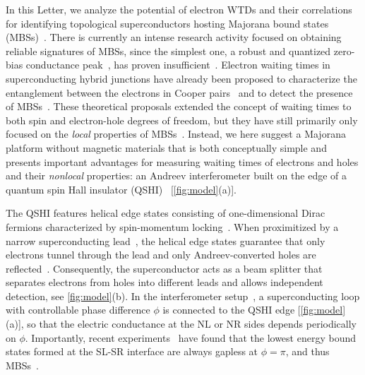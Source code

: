 \documentclass[aps,prl,amsmath,twocolumn,floatfix,superscriptaddress,longbibliography,footinbib]{revtex4-1}
\begin{document}
In this Letter, we analyze the potential of electron WTDs and their correlations for identifying topological superconductors hosting Majorana bound states (MBSs)~\cite{Kane2005,Fu2008,Fu2009,Qi2011}. 
There is currently an intense research activity focused on obtaining reliable signatures of MBSs, since the simplest one, a robust and quantized zero-bias conductance peak~\cite{Mourik2012,Higginbotham2015,Deng2016}, has proven insufficient~\cite{Frolov2019,Frolov2021}. Electron waiting times in superconducting hybrid junctions have already been proposed to characterize the entanglement between the electrons in Cooper pairs~\cite{Rajabi2013,Albert2016,Walldorf2018} and to detect the presence of MBSs~\cite{Chevallier2016,Mi2018,Weymann2020,Fu2022,Schulz2022}. 
These theoretical proposals extended the concept of waiting times to both spin and electron-hole degrees of freedom, but they have still primarily only focused on the \textit{local} properties of MBSs~\cite{Chevallier2016,Mi2018,Weymann2020,Fu2022,Schulz2022}. 
Instead, we here suggest a Majorana platform without magnetic materials that is both conceptually simple and presents important advantages for measuring waiting times of electrons and holes and their \textit{nonlocal} properties: 
an Andreev interferometer built on the edge of a quantum spin Hall insulator (QSHI)~\cite{Konig2007,Brune2010,Sullivan2011,Brune2012,Reis2017,Kammhuber2017,Wu2018} [\cref{fig:model}(a)]. 

The QSHI features helical edge states consisting of one-dimensional Dirac fermions characterized by spin-momentum locking~\cite{Wu2006,Xu2006}. When proximitized by a narrow superconducting lead~\cite{Sullivan2012,Hart2014,Wiedenmann2016,Bocquillon2017,Deacon2017,Hart2017,Sajadi2018,Fatemi2018}, the helical edge states guarantee that only electrons tunnel through the lead and only Andreev-converted holes are reflected~\cite{Adroguer2010,Black-Schaffer2012,Black-Schaffer2013,Crepin2015,Tkachov2015,Cayao2017,Keidel2018,Keidel2020,Cayao2022,Lu2022}. 
Consequently, the superconductor acts as a beam splitter that separates electrons from holes into different leads and allows independent detection, see \cref{fig:model}(b). 
In the interferometer setup~\cite{Chandrasekhar1998,Chandrasekhar2001}, a superconducting loop with controllable phase difference $\phi$ is connected to the QSHI edge [\cref{fig:model}(a)], so that the electric conductance at the NL or NR sides depends periodically on $\phi$. Importantly, recent experiments~\cite{Wiedenmann2016,Bocquillon2017,Deacon2017} have found that the lowest energy bound states formed at the SL-SR interface are always gapless at $\phi=\pi$, and thus MBSs~\cite{Fu2008,Fu2009}. 
\end{document}
